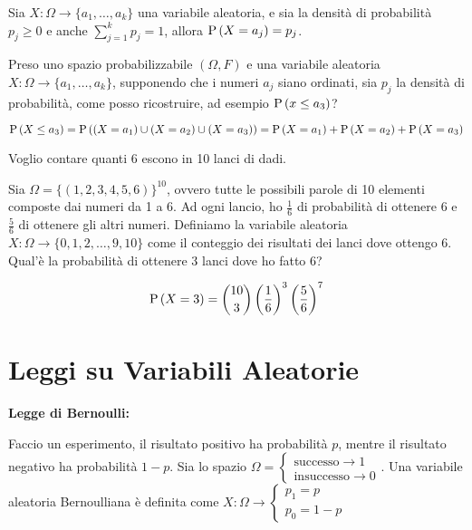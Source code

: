 \begin{defn}
    Sia $ X : \Omega \to \{ a_1, \dots, a_k \} $ una variabile aleatoria, e sia la densità di probabilità $ p_j \geq 0 $ e anche  $ \sum_{j=1}^{k} p_j = 1 $, allora $ \text{P}\left(X = a_j\right) = p_j $.
    
    Preso uno spazio probabilizzabile $ (\Omega, F) $ e una variabile aleatoria $ X : \Omega \to \{ a_1, \dots, a_k \} $, supponendo che i numeri $ a_j $ siano ordinati, sia $ p_j $ la densità di probabilità, come posso ricostruire, ad esempio $ \text{P}\left(x \leq a_3\right) $?

    \begin{equation*}
        \text{P}\left(X \leq a_3\right) = \text{P}\left((X=a_1) \cup (X=a_2) \cup (X=a_3)\right) = \text{P}\left(X = a_1\right) + \text{P}\left(X = a_2\right) + \text{P}\left(X = a_3\right)
    \end{equation*}
    
\end{defn}

\begin{exmp}
    Voglio contare quanti 6 escono in 10 lanci di dadi.
    
    Sia $ \Omega = \{ (1, 2, 3, 4, 5, 6)\}^{10} $, ovvero tutte le possibili parole di 10 elementi composte dai numeri da 1 a 6. Ad ogni lancio, ho $ \frac{1}{6} $ di probabilità di ottenere 6 e $ \frac{5}{6} $ di ottenere gli altri numeri. Definiamo la variabile aleatoria $ X : \Omega \to \{ 0, 1, 2, \dots, 9, 10 \} $ come il conteggio dei risultati dei lanci dove ottengo 6. Qual'è la probabilità di ottenere 3 lanci dove ho fatto 6?
    
    \begin{equation*}
        \text{P}\left(X = 3\right) = \binom{10}{3} \left(\dfrac{1}{6}\right)^3 \left(\dfrac{5}{6}\right)^7 
    \end{equation*}
\end{exmp}

\section{Leggi su Variabili Aleatorie}

\begin{defn}
    \textbf{Legge di Bernoulli:}
\end{defn}
Faccio un esperimento, il risultato positivo ha probabilità $ p $, mentre il risultato negativo ha probabilità $ 1 - p $. Sia lo spazio $ \Omega = \begin{cases}
\text{successo} \to 1 \\
\text{insuccesso} \to 0
\end{cases} $. Una variabile aleatoria Bernoulliana è definita come $ X : \Omega \to \begin{cases}
p_1 = p \\ p_0 = 1 - p
\end{cases} $

